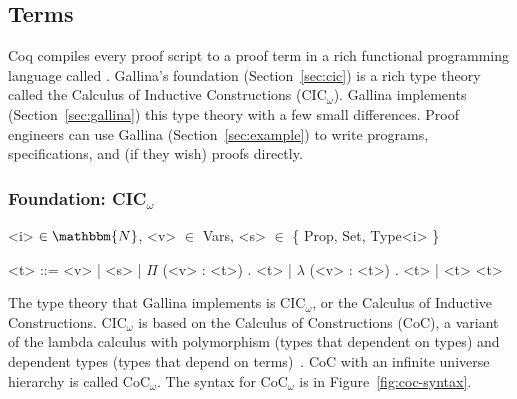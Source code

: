 \subsection{Terms}
\label{sec:mot-coq}


Coq compiles every proof script to a proof term in a rich functional programming language called .
Gallina's foundation (Section~\ref{sec:cic}) is a rich type theory called the Calculus of Inductive Constructions (CIC$_{\omega}$).
Gallina implements (Section~\ref{sec:gallina}) this type theory with a few small differences.
Proof engineers can use Gallina (Section~\ref{sec:example}) to write programs, specifications, and (if they wish) proofs directly.


\subsubsection{Foundation: CIC$_{\omega}$}

\begin{figure*}
\small
\begin{grammar}
<i> $\in \mathbbm{N}$, <v> $\in$ Vars, <s> $\in$ \{ Prop, Set, Type<i> \}

<t> ::= <v> \hspace{0.06cm} | \hspace{0.06cm} <s> \hspace{0.06cm} | \hspace{0.06cm} $\Pi$ (<v> : <t>) . <t> \hspace{0.06cm} | \hspace{0.06cm} $\lambda$ (<v> : <t>) . <t> \hspace{0.06cm} | \hspace{0.06cm} <t> <t>
\end{grammar}
\vspace{-0.3cm}
\caption{Syntax for CoC$_\omega$ with (from left to right) variables, sorts, dependent types, functions, and application.}
\label{fig:coc-syntax}
\end{figure*}

The type theory that Gallina implements is CIC$_{\omega}$, or the Calculus of Inductive Constructions.
CIC$_{\omega}$ is based on the Calculus of Constructions (CoC), a variant of the lambda calculus with polymorphism (types that dependent on types) and dependent types (types that depend on terms)~\cite{coquand:inria-00076024}.
CoC with an infinite universe hierarchy is called CoC$_{\omega}$. %
The syntax for CoC$_{\omega}$ is in Figure~\ref{fig:coc-syntax}.


